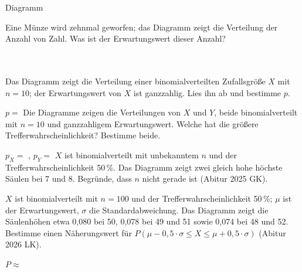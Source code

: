 \setcounter{aufgabe}{26}

\begin{aufgabe}{Diagramm}
\begin{teile}
\teil Eine Münze wird zehnmal geworfen; das Diagramm zeigt die Verteilung der Anzahl von Zahl. Was ist der Erwartungswert dieser Anzahl? \\  \\  \\ 

\teil Das Diagramm zeigt die Verteilung einer binomialverteilten Zufallsgröße $X$ mit $n = 10$; der Erwartungswert von $X$ ist ganzzahlig. Lies ihn ab und bestimme $p$.

$p = $ \leerfeld
\teil Die Diagramme zeigen die Verteilungen von $X$ und $Y$, beide binomialverteilt mit $n = 10$ und ganzzahligem Erwartungswert. Welche hat die größere Trefferwahrscheinlichkeit? Bestimme beide.

 
$p_X = $ \leerfeld , $p_Y = $ \leerfeld
\teil $X$ ist binomialverteilt mit unbekanntem $n$ und der Trefferwahrscheinlichkeit 50\,\%. Das Diagramm zeigt zwei gleich hohe höchste Säulen bei 7 und 8. Begründe, dass $n$ nicht gerade ist \hfill (Abitur 2025 GK).

\teil $X$ ist binomialverteilt mit $n = 100$ und der Trefferwahrscheinlichkeit 50\,\%; $\mu$ ist der Erwartungswert, $\sigma$ die Standardabweichung. Das Diagramm zeigt die Säulenhöhen etwa 0{,}080 bei 50, 0{,}078 bei 49 und 51 sowie 0{,}074 bei 48 und 52. Bestimme einen Näherungswert für $P(\mu - 0{,}5 \cdot \sigma \le X \le \mu + 0{,}5 \cdot \sigma)$ \hfill (Abitur 2026 LK).

$P \approx $ \leerfeld
\end{teile}
\end{aufgabe}

